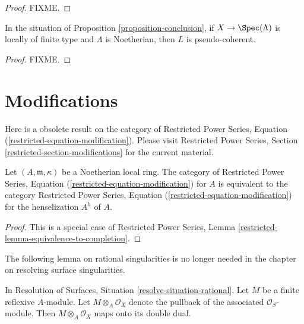 \begin{proof}
FIXME.
\end{proof}

\begin{lemma}
\label{lemma-pseudo-coherent}
In the situation of Proposition \ref{proposition-conclusion}, if
$X \to \Spec(\Lambda)$ is locally of finite type and $\Lambda$ is Noetherian,
then $L$ is pseudo-coherent.
\end{lemma}

\begin{proof}
FIXME.
\end{proof}




\section{Modifications}
\label{section-modifications}

\noindent
Here is a obsolete result on the category of
Restricted Power Series, Equation (\ref{restricted-equation-modification}).
Please visit Restricted Power Series, Section
\ref{restricted-section-modifications}
for the current material.

\begin{lemma}
\label{lemma-henselian}
Let $(A, \mathfrak m, \kappa)$ be a Noetherian local ring.
The category of
Restricted Power Series, Equation (\ref{restricted-equation-modification})
for $A$ is equivalent to the category
Restricted Power Series, Equation (\ref{restricted-equation-modification})
for the henselization $A^h$ of $A$.
\end{lemma}

\begin{proof}
This is a special case of Restricted Power Series, Lemma
\ref{restricted-lemma-equivalence-to-completion}.
\end{proof}

\noindent
The following lemma on rational singularities is no longer needed
in the chapter on resolving surface singularities.

\begin{lemma}
\label{lemma-double-dual-rational}
In Resolution of Surfaces, Situation \ref{resolve-situation-rational}.
Let $M$ be a finite reflexive $A$-module. Let $M \otimes_A \mathcal{O}_X$
denote the pullback of the associated $\mathcal{O}_S$-module. Then
$M \otimes_A \mathcal{O}_X$ maps onto its double dual.
\end{lemma}

